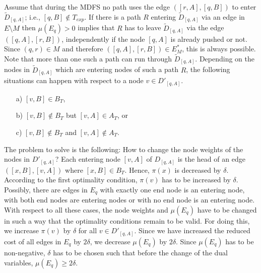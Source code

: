 \documentclass[12pt,twoside,a4paper]{article}
\begin{document}
Assume that during the MDFS no path uses the edge $([r,A],[q,B])$ to enter $\tilde{D}_{[q,A]}$; 
i.e., $[q,B] \not\in T_{exp}$. If there is a path $R$ entering $\tilde{D}_{[q,A]}$ via an edge 
in $E \setminus M$ then $\mu(E_q) > 0$ implies that $R$ has to leave $\tilde{D}_{[q,A]}$ via 
the edge $([q,A],[r,B])$, independently if the node $[q,A]$ is already pushed or not. Since
$(q,r) \in M$ and therefore $([q,A],[r,B]) \in E^*_M$, this is always possible.
Note that more than one such a path can run through $\tilde{D}_{[q,A]}$.
Depending on the nodes in $\tilde{D}_{[q,A]}$ which are entering nodes of such a path $R$,
the following situations can happen with respect to a node $v \in D'_{[q,A]}$.
\begin{itemize}
\item[a)]
$[v,B] \in B_T$,
\item[b)]
$[v,B] \not\in B_T$ but $[v,A] \in A_T$, or
\item[c)]
$[v,B] \not\in B_T$ and $[v,A] \not\in A_T$.
\end{itemize}
The problem to solve is the following: How to change the node weights of the
nodes in $D'_{[q,A]}$?
Each entering node $[v,A]$ of $D_{[q,A]}$ is the head of an edge $([x,B],[v,A])$
where $[x,B] \in B_T$. Hence, $\pi(x)$ is decreased by $\delta$. According to 
the first optimality condition,  $\pi(v)$ has to be increased by $\delta$. 
Possibly, there are edges in $E_q$ with exactly one end node is an entering node, 
with both end nodes are entering nodes or with no end node is an entering node. 
With respect to all these cases, the node weights and $\mu(E_q)$ have to be changed 
in such a way that the optimality conditions remain to be valid.
For doing this, we increase $\pi(v)$ by $\delta$ for all $v \in D'_{[q,A]}$.
Since we have increased the reduced cost of all edges in $E_q$ by $2\delta$,
we decrease $\mu(E_q)$ by $2\delta$. Since $\mu(E_q)$ has to be non-negative, 
$\delta$ has to be chosen such that before the change of the dual variables,
$\mu(E_q) \geq 2\delta$. 
\end{document}
